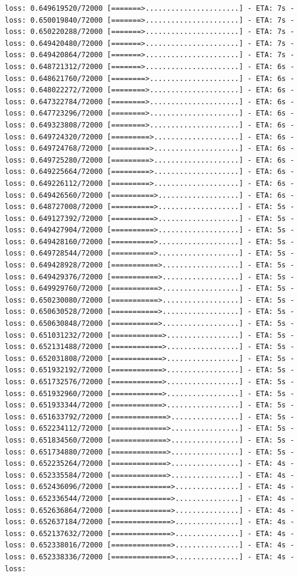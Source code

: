 \documentclass[12pt,fleqn]{article}\usepackage{../../common}
\begin{document}
\begin{verbatim}
loss: 0.649619520/72000 [=======>......................] - ETA: 7s - loss: 0.650019840/72000 [=======>......................] - ETA: 7s - loss: 0.650220288/72000 [=======>......................] - ETA: 7s - loss: 0.649420480/72000 [=======>......................] - ETA: 7s - loss: 0.649420864/72000 [=======>......................] - ETA: 7s - loss: 0.648721312/72000 [=======>......................] - ETA: 6s - loss: 0.648621760/72000 [========>.....................] - ETA: 6s - loss: 0.648022272/72000 [========>.....................] - ETA: 6s - loss: 0.647322784/72000 [========>.....................] - ETA: 6s - loss: 0.647723296/72000 [========>.....................] - ETA: 6s - loss: 0.649323808/72000 [========>.....................] - ETA: 6s - loss: 0.649724320/72000 [=========>....................] - ETA: 6s - loss: 0.649724768/72000 [=========>....................] - ETA: 6s - loss: 0.649725280/72000 [=========>....................] - ETA: 6s - loss: 0.649225664/72000 [=========>....................] - ETA: 6s - loss: 0.649226112/72000 [=========>....................] - ETA: 6s - loss: 0.649426560/72000 [==========>...................] - ETA: 6s - loss: 0.648727008/72000 [==========>...................] - ETA: 5s - loss: 0.649127392/72000 [==========>...................] - ETA: 5s - loss: 0.649427904/72000 [==========>...................] - ETA: 5s - loss: 0.649428160/72000 [==========>...................] - ETA: 5s - loss: 0.649728544/72000 [==========>...................] - ETA: 5s - loss: 0.649428928/72000 [===========>..................] - ETA: 5s - loss: 0.649429376/72000 [===========>..................] - ETA: 5s - loss: 0.649929760/72000 [===========>..................] - ETA: 5s - loss: 0.650230080/72000 [===========>..................] - ETA: 5s - loss: 0.650630528/72000 [===========>..................] - ETA: 5s - loss: 0.650630848/72000 [===========>..................] - ETA: 5s - loss: 0.651031232/72000 [============>.................] - ETA: 5s - loss: 0.652131488/72000 [============>.................] - ETA: 5s - loss: 0.652031808/72000 [============>.................] - ETA: 5s - loss: 0.651932192/72000 [============>.................] - ETA: 5s - loss: 0.651732576/72000 [============>.................] - ETA: 5s - loss: 0.651932960/72000 [============>.................] - ETA: 5s - loss: 0.651933344/72000 [============>.................] - ETA: 5s - loss: 0.651633792/72000 [=============>................] - ETA: 5s - loss: 0.652234112/72000 [=============>................] - ETA: 5s - loss: 0.651834560/72000 [=============>................] - ETA: 5s - loss: 0.651734880/72000 [=============>................] - ETA: 5s - loss: 0.652235264/72000 [=============>................] - ETA: 4s - loss: 0.652335584/72000 [=============>................] - ETA: 4s - loss: 0.652436096/72000 [==============>...............] - ETA: 4s - loss: 0.652336544/72000 [==============>...............] - ETA: 4s - loss: 0.652636864/72000 [==============>...............] - ETA: 4s - loss: 0.652637184/72000 [==============>...............] - ETA: 4s - loss: 0.652137632/72000 [==============>...............] - ETA: 4s - loss: 0.652338016/72000 [==============>...............] - ETA: 4s - loss: 0.652338336/72000 [==============>...............] - ETA: 4s - loss: 
\end{verbatim}
\end{document}
